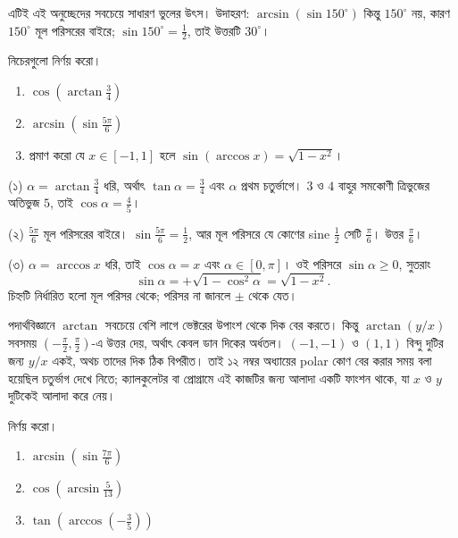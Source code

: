 \documentclass[11pt]{article}
\begin{document}
এটিই এই অনুচ্ছেদের সবচেয়ে সাধারণ ভুলের উৎস। উদাহরণ:
$\arcsin\left( \sin 150^{\circ} \right)$ কিন্তু $150^{\circ}$ নয়, কারণ
$150^{\circ}$ মূল পরিসরের বাইরে; $\sin 150^{\circ} = \tfrac{1}{2}$, তাই
উত্তরটি $30^{\circ}$।

\begin{example}
নিচেরগুলো নির্ণয় করো।
\begin{enumerate}
  \item $\cos\left( \arctan\tfrac{3}{4} \right)$
  \item $\arcsin\left( \sin\tfrac{5\pi}{6} \right)$
  \item প্রমাণ করো যে $x \in [-1,1]$ হলে
        $\sin(\arccos x) = \sqrt{1-x^{2}}$।
\end{enumerate}
\end{example}

\begin{solbox}
(১) $\alpha = \arctan\tfrac{3}{4}$ ধরি, অর্থাৎ $\tan\alpha = \tfrac{3}{4}$ এবং
$\alpha$ প্রথম চতুর্ভাগে। $3$ ও $4$ বাহুর সমকোণী ত্রিভুজের অতিভুজ $5$, তাই
$\cos\alpha = \tfrac{4}{5}$।

(২) $\tfrac{5\pi}{6}$ মূল পরিসরের বাইরে। $\sin\tfrac{5\pi}{6} = \tfrac{1}{2}$,
আর মূল পরিসরে যে কোণের sine $\tfrac{1}{2}$ সেটি $\tfrac{\pi}{6}$। উত্তর
$\tfrac{\pi}{6}$।

(৩) $\alpha = \arccos x$ ধরি, তাই $\cos\alpha = x$ এবং $\alpha \in [0,\pi]$।
ওই পরিসরে $\sin\alpha \geq 0$, সুতরাং
\[
  \sin\alpha = +\sqrt{1-\cos^{2}\alpha} = \sqrt{1-x^{2}} .
\]
চিহ্নটি নির্ধারিত হলো মূল পরিসর থেকে; পরিসর না জানলে $\pm$ থেকে যেত।
\end{solbox}

\begin{remark}
পদার্থবিজ্ঞানে $\arctan$ সবচেয়ে বেশি লাগে ভেক্টরের উপাংশ থেকে দিক বের করতে।
কিন্তু $\arctan(y/x)$ সবসময় $\left( -\tfrac{\pi}{2}, \tfrac{\pi}{2} \right)$-এ
উত্তর দেয়, অর্থাৎ কেবল ডান দিকের অর্ধতল। $(-1,-1)$ ও $(1,1)$ বিন্দু দুটির
জন্য $y/x$ একই, অথচ তাদের দিক ঠিক বিপরীত। তাই ১২ নম্বর অধ্যায়ের polar
কোণ বের করার সময় বলা হয়েছিল চতুর্ভাগ দেখে নিতে; ক্যালকুলেটর বা প্রোগ্রামে এই
কাজটির জন্য আলাদা একটি ফাংশন থাকে, যা $x$ ও $y$ দুটিকেই আলাদা করে নেয়।
\end{remark}

 নির্ণয় করো।
\begin{enumerate}
  \item $\arcsin\left( \sin\tfrac{7\pi}{6} \right)$
  \item $\cos\left( \arcsin\tfrac{5}{13} \right)$
  \item $\tan\left( \arccos\left( -\tfrac{3}{5} \right) \right)$
\end{enumerate}
\end{document}
